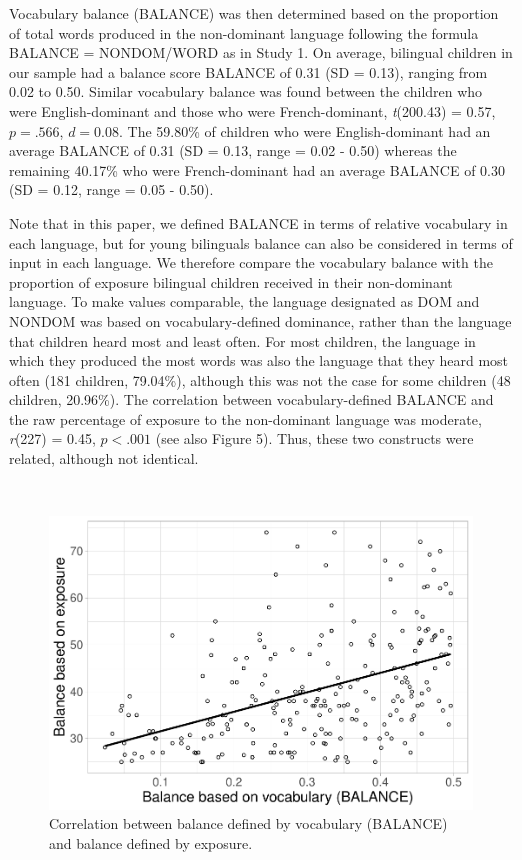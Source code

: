\documentclass[
  english,
  ,man,floatsintext]{apa6}
\begin{document}
Vocabulary balance (BALANCE) was then determined based on the proportion of total words produced in the non-dominant language following the formula BALANCE = NONDOM/WORD as in Study 1. On average, bilingual children in our sample had a balance score BALANCE of 0.31 (SD = 0.13), ranging from 0.02 to 0.50. Similar vocabulary balance was found between the children who were English-dominant and those who were French-dominant, \emph{t}(200.43) = 0.57, \(p = .566\), \(d = 0.08\). The 59.80\% of children who were English-dominant had an average BALANCE of 0.31 (SD = 0.13, range = 0.02 - 0.50) whereas the remaining 40.17\% who were French-dominant had an average BALANCE of 0.30 (SD = 0.12, range = 0.05 - 0.50).

Note that in this paper, we defined BALANCE in terms of relative vocabulary in each language, but for young bilinguals balance can also be considered in terms of input in each language. We therefore compare the vocabulary balance with the proportion of exposure bilingual children received in their non-dominant language. To make values comparable, the language designated as DOM and NONDOM was based on vocabulary-defined dominance, rather than the language that children heard most and least often. For most children, the language in which they produced the most words was also the language that they heard most often (181 children, 79.04\%), although this was not the case for some children (48 children, 20.96\%). The correlation between vocabulary-defined BALANCE and the raw percentage of exposure to the non-dominant language was moderate, \emph{r}(227) = 0.45, \(p < .001\) (see also Figure 5). Thus, these two constructs were related, although not identical.

~

\begin{figure}[H]

{\centering \includegraphics[width=0.75\linewidth]{paper_TE_bilingual_vocabulary_model_files/figure-latex/fig5-1} 

}

\caption{Correlation between balance defined by vocabulary (BALANCE) and balance defined by exposure.}\label{fig:fig5}
\end{figure}
\end{document}
